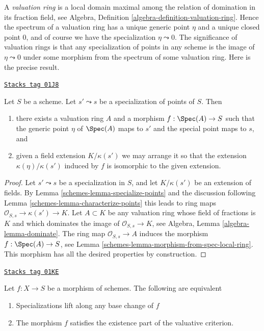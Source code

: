A {\it valuation ring} is a local domain maximal among the relation
of domination in its fraction field, see
Algebra, Definition \ref{algebra-definition-valuation-ring}.
Hence the spectrum of a valuation ring has a unique generic point
$\eta$ and a unique closed point $0$, and of course we have the
specialization $\eta \leadsto 0$.
The significance of valuation rings is that any specialization of
points in any scheme is the image of $\eta \leadsto 0$
under some morphism from the spectrum of some valuation ring.
Here is the precise result.

\begin{lemma}
\label{schemes-lemma-points-specialize}
\href{https://stacks.math.columbia.edu/tag/01J8}{\texttt{Stacks tag 01J8}}


Let $S$ be a scheme. Let $s' \leadsto s$ be a specialization of points of $S$.
Then
\begin{enumerate}
\item there exists a valuation ring $A$ and a morphism
$f : \Spec(A) \to S$ such that the generic point $\eta$ of
$\Spec(A)$ maps to $s'$ and the special point maps to $s$, and
\item given a field extension $K/\kappa(s')$
we may arrange it so that the extension
$\kappa(\eta)/\kappa(s')$ induced by $f$
is isomorphic to the given extension.
\end{enumerate}
\end{lemma}

\begin{proof}

Let $s' \leadsto s$ be a specialization in $S$, and let
$K/\kappa(s')$ be an extension of fields. By
Lemma \ref{schemes-lemma-specialize-points}
and the discussion following
Lemma \ref{schemes-lemma-characterize-points}
this leads to ring maps $\mathcal{O}_{S, s} \to \kappa(s') \to K$.
Let $A \subset K$ be any valuation ring whose field of fractions is
$K$ and which dominates the image of $\mathcal{O}_{S, s} \to K$, see
Algebra, Lemma \ref{algebra-lemma-dominate}.
The ring map $\mathcal{O}_{S, s} \to A$ induces the morphism
$f : \Spec(A) \to S$, see
Lemma \ref{schemes-lemma-morphism-from-spec-local-ring}.
This morphism has all the desired properties by construction.
\end{proof}

\begin{lemma}
\label{schemes-lemma-lift-specializations-valuative}
\href{https://stacks.math.columbia.edu/tag/01KE}{\texttt{Stacks tag 01KE}}

Let $f : X \to S$ be a morphism of schemes.
The following are equivalent
\begin{enumerate}
\item Specializations lift along any base change of $f$
\item The morphism $f$ satisfies the existence part of the
valuative criterion.
\end{enumerate}
\end{lemma}

